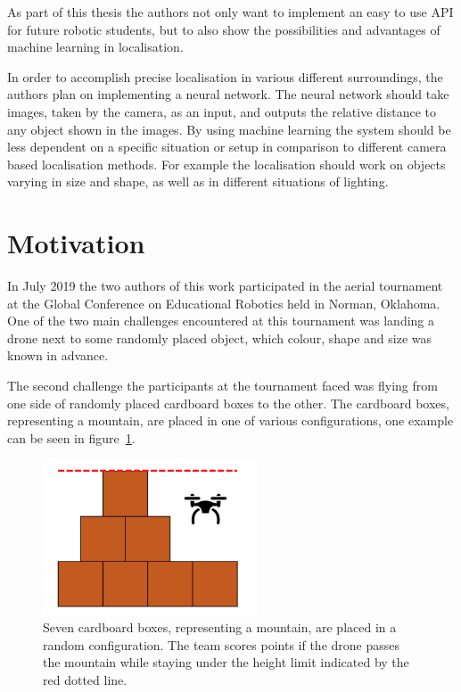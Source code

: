 As part of this thesis the authors not only want to implement an easy to use API for future robotic students, but to also show the possibilities and advantages of machine learning in localisation.

In order to accomplish precise localisation in various different surroundings, the authors plan on implementing a neural network. The neural network should take images, taken by the camera, as an input, and outputs the relative distance to any object shown in the images. By using machine learning the system should be less dependent on a specific situation or setup in comparison to different camera based localisation methods. For example the localisation should work on objects varying in size and shape, as well as in different situations of lighting.

\section{Motivation}
\label{sec:introduction_motivation}
In July 2019 the two authors of this work participated in the aerial tournament at the Global Conference on Educational Robotics held in Norman, Oklahoma. One of the two main challenges encountered at this tournament was landing a drone next to some randomly placed object, which colour, shape and size was known in advance.

The second challenge the participants at the tournament faced was flying from one side of randomly placed cardboard boxes to the other. The cardboard boxes, representing a mountain, are placed in one of various configurations, one example can be seen in figure~\ref{pic:introduction_motivation_mountain}.

\begin{figure}[h]
	\centering
	\includegraphics[width=2.5in]{img/introduction_motivation_mountain.png}
	\caption{Seven cardboard boxes, representing a mountain, are placed in a random configuration. The team scores points if the drone passes the mountain while staying under the height limit indicated by the red dotted line.}
	\label{pic:introduction_motivation_mountain}
\end{figure}

